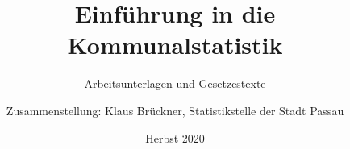 \documentclass[A4, 12pt]{scrbook}
\title{Einführung in die Kommunalstatistik}
\subtitle{Arbeitsunterlagen und Gesetzestexte}
\author{Zusammenstellung: Klaus Brückner, Statistikstelle der Stadt Passau}
\date{Herbst 2020}
\begin{document}
\dominitoc
\maketitle
\tableofcontents




% 

















    

\end{document}
